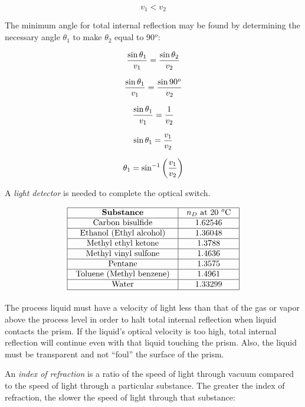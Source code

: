 $$v_1 < v_2$$

\vskip 10pt

The minimum angle for total internal reflection may be found by determining the necessary angle $\theta_1$ to make $\theta_2$ equal to 90$^{o}$:

$${{\sin \theta_1} \over v_1} = {{\sin \theta_2} \over v_2}$$

$${{\sin \theta_1} \over v_1} = {{\sin 90^o} \over v_2}$$

$${{\sin \theta_1} \over v_1} = {1 \over v_2}$$

$$\sin \theta_1 = {v_1 \over v_2}$$

$$\theta_1 = \sin^{-1} \left( {v_1 \over v_2} \right)$$

\vskip 10pt

A {\it light detector} is needed to complete the optical switch.

\vskip 20pt


$$\vbox{\offinterlineskip
\halign{\strut
\vrule \quad\hfil # \ \hfil & 
\vrule \quad\hfil # \ \hfil \vrule \cr
\noalign{\hrule}
%
{\bf Substance} & $n_D$ at 20 $^{o}$C \cr
%
\noalign{\hrule}
%
Carbon bisulfide & 1.62546 \cr
%
\noalign{\hrule}
%
Ethanol (Ethyl alcohol) & 1.36048 \cr
%
\noalign{\hrule}
%
Methyl ethyl ketone & 1.3788 \cr
%
\noalign{\hrule}
%
Methyl vinyl sulfone & 1.4636 \cr
%
\noalign{\hrule}
%
Pentane & 1.3575 \cr
%
\noalign{\hrule}
%
Toluene (Methyl benzene) & 1.4961 \cr
%
\noalign{\hrule}
%
Water & 1.33299 \cr
%
\noalign{\hrule}
} %
}$$ %


The process liquid must have a velocity of light less than that of the gas or vapor above the process level in order to halt total internal reflection when liquid contacts the prism.  If the liquid's optical velocity is too high, total internal reflection will continue even with that liquid touching the prism.  Also, the liquid must be transparent and not ``foul'' the surface of the prism.

\vskip 10pt

An {\it index of refraction} is a ratio of the speed of light through vacuum compared to the speed of light through a particular substance.  The greater the index of refraction, the slower the speed of light through that substance:

